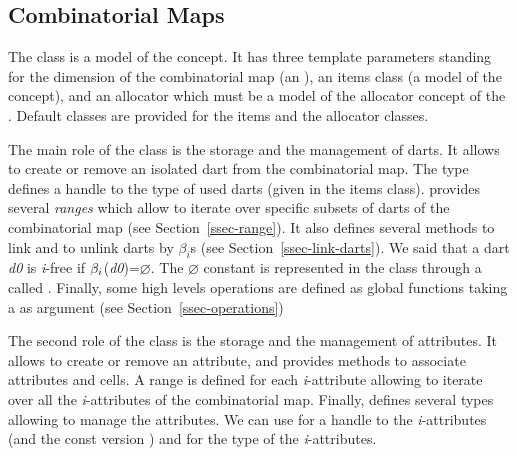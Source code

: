 \subsection{Combinatorial Maps}\label{ssec-combinatorial-map}
The class  is a model of the
 concept.  It has three template parameters
standing for the dimension of the combinatorial map (an 
), an items class (a model of the 
concept), and an allocator which must be a model of the allocator
concept of the {\stl}.  Default classes are provided for the items and
the allocator classes.

The main role of the class  is the storage and
the management of darts. It allows to create or remove an isolated
dart from the combinatorial map.  The  type defines a
handle to the type of used darts (given in the items class).
 provides several \emph{ranges} which allow to
iterate over specific subsets of darts of the combinatorial map (see
Section~\ref{ssec-range}).  It also defines several methods to link
and to unlink darts by $\beta_i$s (see
Section~\ref{ssec-link-darts}). We said that a dart \emph{d0} is \emph{i}-free 
if $\beta_{i}$(\emph{d0})=$\varnothing$.   The $\varnothing$ constant is
represented in the class  through a 
called \nulldart.  Finally, some high levels
operations are defined as global functions taking a
 as argument (see
Section~\ref{ssec-operations})



The second role of the class  is the storage
and the management of attributes.  It allows to create or remove an
attribute, and provides methods to associate attributes and cells.
A range is defined for each \emph{i}-attribute allowing to iterate
over all the \emph{i}-attributes of the combinatorial map.  Finally,
 defines several types allowing to manage the
attributes. We can use
 for a handle to the
\emph{i}-attributes (and the const version
) and
 for the type of the
\emph{i}-attributes.

